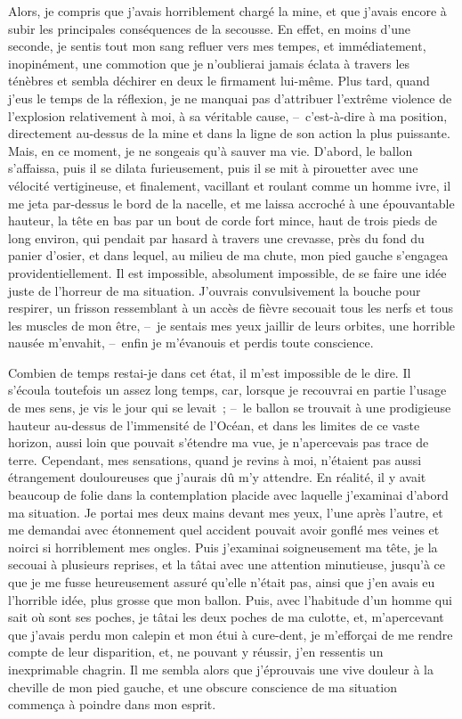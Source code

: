 \documentclass[french,twoside]{book} %
\begin{document}
Alors, je compris que j’avais horriblement chargé la mine, et que j’avais encore à subir les principales conséquences de la secousse. En effet, en moins d’une seconde, je sentis tout mon sang refluer vers mes tempes, et immédiatement, inopinément, une commotion que je n’oublierai jamais éclata à travers les ténèbres et sembla déchirer en deux le firmament lui-même. Plus tard, quand j’eus le temps de la réflexion, je ne manquai pas d’attribuer l’extrême violence de l’explosion relativement à moi, à sa véritable cause, – c’est-à-dire à ma position, directement au-dessus de la mine et dans la ligne de son action la plus puissante. Mais, en ce moment, je ne songeais qu’à sauver ma vie. D’abord, le ballon s’affaissa, puis il se dilata furieusement, puis il se mit à pirouetter avec une vélocité vertigineuse, et finalement, vacillant et roulant comme un homme ivre, il me jeta par-dessus le bord de la nacelle, et me laissa accroché à une épouvantable hauteur, la tête en bas par un bout de corde fort mince, haut de trois pieds de long environ, qui pendait par hasard à travers une crevasse, près du fond du panier d’osier, et dans lequel, au milieu de ma chute, mon pied gauche s’engagea providentiellement. Il est impossible, absolument impossible, de se faire une idée juste de l’horreur de ma situation. J’ouvrais convulsivement la bouche pour respirer, un frisson ressemblant à un accès de fièvre secouait tous les nerfs et tous les muscles de mon être, – je sentais mes yeux jaillir de leurs orbites, une horrible nausée m’envahit, – enfin je m’évanouis et perdis toute conscience.\par
Combien de temps restai-je dans cet état, il m’est impossible de le dire. Il s’écoula toutefois un assez long temps, car, lorsque je recouvrai en partie l’usage de mes sens, je vis le jour qui se levait ; – le ballon se trouvait à une prodigieuse hauteur au-dessus de l’immensité de l’Océan, et dans les limites de ce vaste horizon, aussi loin que pouvait s’étendre ma vue, je n’apercevais pas trace de terre. Cependant, mes sensations, quand je revins à moi, n’étaient pas aussi étrangement douloureuses que j’aurais dû m’y attendre. En réalité, il y avait beaucoup de folie dans la contemplation placide avec laquelle j’examinai d’abord ma situation. Je portai mes deux mains devant mes yeux, l’une après l’autre, et me demandai avec étonnement quel accident pouvait avoir gonflé mes veines et noirci si horriblement mes ongles. Puis j’examinai soigneusement ma tête, je la secouai à plusieurs reprises, et la tâtai avec une attention minutieuse, jusqu’à ce que je me fusse heureusement assuré qu’elle n’était pas, ainsi que j’en avais eu l’horrible idée, plus grosse que mon ballon. Puis, avec l’habitude d’un homme qui sait où sont ses poches, je tâtai les deux poches de ma culotte, et, m’apercevant que j’avais perdu mon calepin et mon étui à cure-dent, je m’efforçai de me rendre compte de leur disparition, et, ne pouvant y réussir, j’en ressentis un inexprimable chagrin. Il me sembla alors que j’éprouvais une vive douleur à la cheville de mon pied gauche, et une obscure conscience de ma situation commença à poindre dans mon esprit.\par
\end{document}
